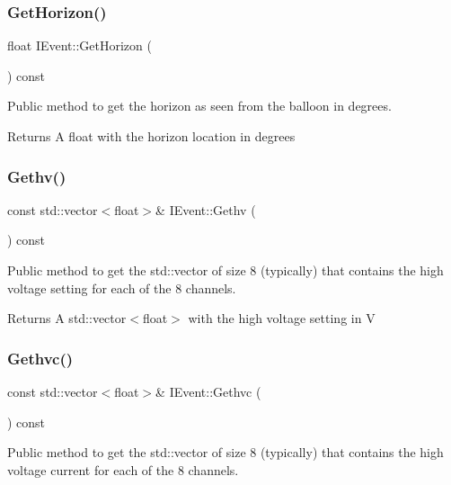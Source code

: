 \subsubsection{\texorpdfstring{Get\+Horizon()}{GetHorizon()}}
{\footnotesize\ttfamily float I\+Event\+::\+Get\+Horizon (\begin{DoxyParamCaption}{ }\end{DoxyParamCaption}) const}



Public method to get the horizon as seen from the balloon in degrees. 

\begin{DoxyReturn}{Returns}
A float with the horizon location in degrees 
\end{DoxyReturn}
\mbox{\label{classIEvent_aa807a64494e2a7d87c2cf430574a1b0c}} 
\subsubsection{\texorpdfstring{Gethv()}{Gethv()}}
{\footnotesize\ttfamily const std\+::vector$<$float$>$\& I\+Event\+::\+Gethv (\begin{DoxyParamCaption}{ }\end{DoxyParamCaption}) const}



Public method to get the std\+::vector of size 8 (typically) that contains the high voltage setting for each of the 8 channels. 

\begin{DoxyReturn}{Returns}
A std\+::vector$<$float$>$ with the high voltage setting in V 
\end{DoxyReturn}
\mbox{\label{classIEvent_a8bf0dad45d6a5aef35cbd32e58e79d95}} 
\subsubsection{\texorpdfstring{Gethvc()}{Gethvc()}}
{\footnotesize\ttfamily const std\+::vector$<$float$>$\& I\+Event\+::\+Gethvc (\begin{DoxyParamCaption}{ }\end{DoxyParamCaption}) const}



Public method to get the std\+::vector of size 8 (typically) that contains the high voltage current for each of the 8 channels. 

